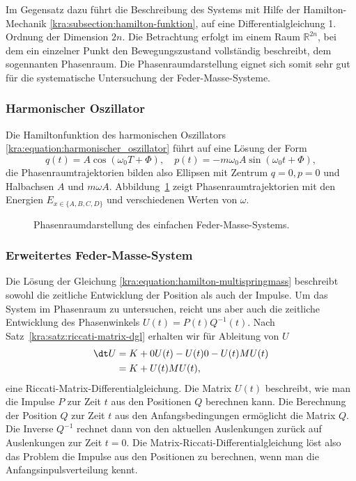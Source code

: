 Im Gegensatz dazu führt die Beschreibung des Systems mit Hilfe der Hamilton-Mechanik \ref{kra:subsection:hamilton-funktion}, auf eine Differentialgleichung 1. Ordnung der Dimension $2n$.
Die Betrachtung erfolgt im einem Raum $\mathbb{R}^{2n}$, bei dem ein einzelner Punkt den Bewegungszustand vollständig beschreibt, dem sogennanten Phasenraum.
Die Phasenraumdarstellung eignet sich somit sehr gut für die systematische Untersuchung der Feder-Masse-Systeme.

\subsubsection{Harmonischer Oszillator}
Die Hamiltonfunktion des harmonischen Oszillators \eqref{kra:equation:harmonischer_oszillator} führt auf eine Lösung der Form
\begin{equation*}
    q(t) = A \cos(\omega_0 T + \Phi), \quad p(t) = -m \omega_0 A \sin(\omega_0 t + \Phi),
\end{equation*}
die Phasenraumtrajektorien bilden also Ellipsen mit Zentrum $q=0, p=0$ und Halbachsen $A$ und $m \omega A$.
Abbildung~\ref{kra:fig:phasenraum} zeigt Phasenraumtrajektorien mit den Energien $E_{x \in \{A, B, C, D\}}$ und verschiedenen Werten von $\omega$.
\begin{figure}
    \centering
    
    \caption{Phasenraumdarstellung des einfachen Feder-Masse-Systems.}
    \label{kra:fig:phasenraum}
\end{figure}

\subsubsection{Erweitertes Feder-Masse-System}
Die Lösung der Gleichung \eqref{kra:equation:hamilton-multispringmass} beschreibt sowohl die zeitliche Entwicklung der Position als auch der Impulse.
Um das System im Phasenraum zu untersuchen, reicht uns aber auch die zeitliche Entwicklung des Phasenwinkels $U(t) = P(t)Q^{-1}(t)$.
Nach Satz~\ref{kra:satz:riccati-matrix-dgl} erhalten wir für Ableitung von $U$
\begin{equation}
    \begin{split}
        \dt U   &= K  + 0U(t) - U(t)0 - U(t)MU(t) \\
        &= K + U(t)MU(t),
    \end{split}
\end{equation}
eine Riccati-Matrix-Differentialgleichung.
Die Matrix $U(t)$ beschreibt, wie man die Impulse $P$ zur Zeit $t$ aus den Positionen $Q$ berechnen kann.
Die Berechnung der Position $Q$ zur Zeit $t$ aus den Anfangsbedingungen ermöglicht die Matrix $Q$.
Die Inverse $Q^{-1}$ rechnet dann von den aktuellen Auslenkungen zurück auf Auslenkungen zur Zeit $t=0$.
Die Matrix-Riccati-Differentialgleichung löst also das Problem die Impulse aus den Positionen zu berechnen, wenn man die Anfangsinpulsverteilung kennt.

